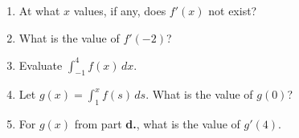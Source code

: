 \documentclass[11pt,fleqn]{article}
\def\ds{\displaystyle}
\begin{document}
\begin{enumerate}
\bigskip
\begin{enumerate}
\item At what $x$ values, if any, does $f'(x)$ not exist?

\vfill

\item  What is the value of $f'(-2)$?

\vfill

\item  Evaluate $\ds \int_{-1}^{4} f(x)\,dx$.

\vfill

\item  Let $g(x) =\ds \int_1^x f(s)\,ds$.  What is the value of $g(0)$?

\vfill

\item  For $g(x)$ from part \textbf{d.}, what is the value of $g'(4)$.

\vfill
\end{enumerate}


\end{enumerate}
\end{document}
